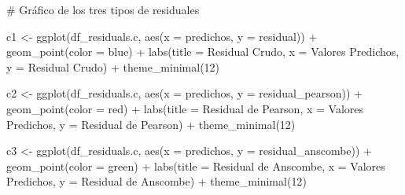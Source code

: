\documentclass[
  letterpaper,
  DIV=11,
  numbers=noendperiod]{scrartcl}
\newenvironment{Shaded}{\begin{snugshade}}{\end{snugshade}}
\newcommand{\AttributeTok}[1]{\textcolor[rgb]{0.40,0.45,0.13}{#1}}
\newcommand{\CommentTok}[1]{\textcolor[rgb]{0.37,0.37,0.37}{#1}}
\newcommand{\DecValTok}[1]{\textcolor[rgb]{0.68,0.00,0.00}{#1}}
\newcommand{\FunctionTok}[1]{\textcolor[rgb]{0.28,0.35,0.67}{#1}}
\newcommand{\NormalTok}[1]{\textcolor[rgb]{0.00,0.23,0.31}{#1}}
\newcommand{\OtherTok}[1]{\textcolor[rgb]{0.00,0.23,0.31}{#1}}
\newcommand{\SpecialCharTok}[1]{\textcolor[rgb]{0.37,0.37,0.37}{#1}}
\newcommand{\StringTok}[1]{\textcolor[rgb]{0.13,0.47,0.30}{#1}}
\begin{document}
\begin{Shaded}
\begin{Highlighting}[]
\CommentTok{\# Gráfico de los tres tipos de residuales}

\NormalTok{c1 }\OtherTok{\textless{}{-}} \FunctionTok{ggplot}\NormalTok{(df\_residuals.c, }\FunctionTok{aes}\NormalTok{(}\AttributeTok{x =}\NormalTok{ predichos, }\AttributeTok{y =}\NormalTok{ residual)) }\SpecialCharTok{+}
    \FunctionTok{geom\_point}\NormalTok{(}\AttributeTok{color =} \StringTok{\textquotesingle{}blue\textquotesingle{}}\NormalTok{) }\SpecialCharTok{+}
    \FunctionTok{labs}\NormalTok{(}\AttributeTok{title =} \StringTok{\textquotesingle{}Residual Crudo\textquotesingle{}}\NormalTok{, }\AttributeTok{x =} \StringTok{\textquotesingle{}Valores Predichos\textquotesingle{}}\NormalTok{, }\AttributeTok{y =} \StringTok{\textquotesingle{}Residual Crudo\textquotesingle{}}\NormalTok{) }\SpecialCharTok{+}
    \FunctionTok{theme\_minimal}\NormalTok{(}\DecValTok{12}\NormalTok{)}

\NormalTok{c2 }\OtherTok{\textless{}{-}} \FunctionTok{ggplot}\NormalTok{(df\_residuals.c, }\FunctionTok{aes}\NormalTok{(}\AttributeTok{x =}\NormalTok{ predichos, }\AttributeTok{y =}\NormalTok{ residual\_pearson)) }\SpecialCharTok{+}
    \FunctionTok{geom\_point}\NormalTok{(}\AttributeTok{color =} \StringTok{\textquotesingle{}red\textquotesingle{}}\NormalTok{) }\SpecialCharTok{+}
    \FunctionTok{labs}\NormalTok{(}\AttributeTok{title =} \StringTok{\textquotesingle{}Residual de Pearson\textquotesingle{}}\NormalTok{, }\AttributeTok{x =} \StringTok{\textquotesingle{}Valores Predichos\textquotesingle{}}\NormalTok{, }\AttributeTok{y =} \StringTok{\textquotesingle{}Residual de Pearson\textquotesingle{}}\NormalTok{) }\SpecialCharTok{+}
    \FunctionTok{theme\_minimal}\NormalTok{(}\DecValTok{12}\NormalTok{)}

\NormalTok{c3 }\OtherTok{\textless{}{-}} \FunctionTok{ggplot}\NormalTok{(df\_residuals.c, }\FunctionTok{aes}\NormalTok{(}\AttributeTok{x =}\NormalTok{ predichos, }\AttributeTok{y =}\NormalTok{ residual\_anscombe)) }\SpecialCharTok{+}
    \FunctionTok{geom\_point}\NormalTok{(}\AttributeTok{color =} \StringTok{\textquotesingle{}green\textquotesingle{}}\NormalTok{) }\SpecialCharTok{+}
    \FunctionTok{labs}\NormalTok{(}\AttributeTok{title =} \StringTok{\textquotesingle{}Residual de Anscombe\textquotesingle{}}\NormalTok{, }\AttributeTok{x =} \StringTok{\textquotesingle{}Valores Predichos\textquotesingle{}}\NormalTok{, }\AttributeTok{y =} \StringTok{\textquotesingle{}Residual de Anscombe\textquotesingle{}}\NormalTok{) }\SpecialCharTok{+}
    \FunctionTok{theme\_minimal}\NormalTok{(}\DecValTok{12}\NormalTok{)}


\end{Highlighting}
\end{Shaded}
\end{document}
